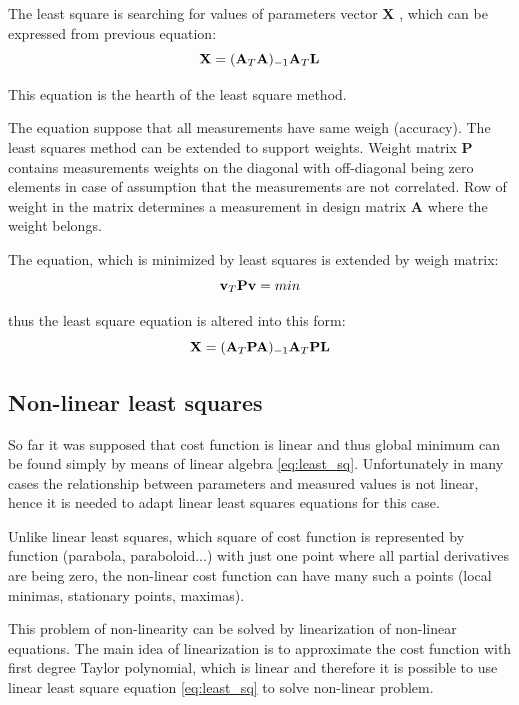 \documentclass[a4paper,12pt]{report}
\newcommand{\ematr}[1]{
{\bf #1}
}
\newcommand{\evect}[1]{
{\bf #1}
}
\begin{document}
The least square is searching for values of parameters vector \evect{X}, which can be expressed from previous equation:
\begin{equation}
\evect{X} = (\ematr{A}_{T} \ematr{A})_{-1} \ematr{A}_{T} \ematr{L}
\end{equation}

This equation is the hearth of the least square method.

The equation suppose that all measurements have same weigh (accuracy). The least squares method can be extended to support weights.
Weight matrix \ematr{P} contains measurements weights on the diagonal with off-diagonal being zero elements in case of assumption that 
the measurements are not correlated.
Row of weight in the matrix determines a measurement in design matrix \ematr{A} where the weight belongs.

The equation, which is minimized by least squares is extended by weigh matrix:
\begin{equation}
\evect{v}_{T}  \ematr{P} \evect{v} = min
\end{equation}

thus the least square equation is altered into this form:
\begin{equation}
\evect{X} = (\ematr{A}_{T} \ematr{P} \ematr{A})_{-1} \ematr{A}_{T} \ematr{P} \ematr{L}
\label{eq:least_sq}
\end{equation}

\subsection{Non-linear least squares}
\label{sec:non_least}
So far it was supposed that cost function is linear and thus global minimum can be found simply by means of linear algebra  \eqref{eq:least_sq}.
Unfortunately in many cases the relationship between parameters and 
measured values is not linear, hence it is needed to adapt linear least squares equations for this case.

Unlike linear least squares, which square of cost function is represented by function  (parabola, paraboloid...) with just one point where all
partial derivatives are being zero, the non-linear cost function can have many such a points (local minimas, stationary points, maximas). 

This problem of non-linearity can be solved by linearization of non-linear equations.
The main idea of linearization is to approximate the cost function with first degree Taylor polynomial,
which is linear and therefore it is possible to use linear least square equation \eqref{eq:least_sq} 
to solve non-linear problem. 
\end{document}
